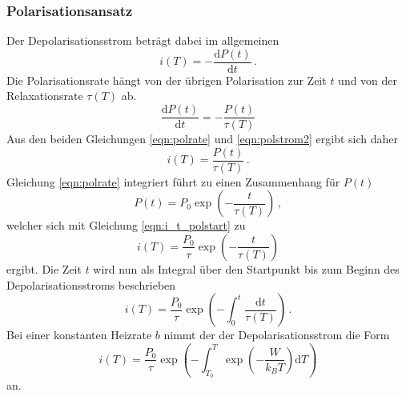 \subsubsection{Polarisationsansatz}
Der Depolarisationsstrom beträgt dabei im allgemeinen
\begin{equation}
    i(T) = -\frac{\mathrm{d}P(t)}{\mathrm{d}t}\,.
    \label{eqn:polstrom2}
\end{equation}
Die Polarisationsrate hängt von der übrigen Polarisation zur Zeit $t$
und von der Relaxationsrate $\tau(T)$ ab.
\begin{equation}
    \frac{\text{d}{P(t)}}{\text{d}{t}} = -\frac{P(t)}{\tau(T)}
    \label{eqn:polrate}
\end{equation}
Aus den beiden Gleichungen \eqref{eqn:polrate} und \eqref{eqn:polstrom2} ergibt sich daher
\begin{equation}
    i(T) = \frac{P(t)}{\tau(T)}\,.
    \label{eqn:i_t_polstart}
\end{equation}
Gleichung \eqref{eqn:polrate} integriert führt zu einen Zusammenhang für $P(t)$
\begin{equation}
    P(t) = P_{0} \exp\!\left(-\frac{t}{\tau(T)}\right)\,,
\end{equation}
welcher sich mit Gleichung \eqref{eqn:i_t_polstart} zu
\begin{equation}
    i(T) = \frac{P_0}{\tau} \exp\!\left(-\frac{t}{\tau(T)}\right) 
\end{equation}
ergibt.
Die Zeit $t$ wird nun als Integral über den Startpunkt bis zum Beginn des Depolarisationsstroms beschrieben
\begin{equation}
    i(T) = \frac{P_{0}}{\tau} \exp\!\left(-\int_0^t \frac{\text{d}{t}}{\tau(T)}\right)\,.
\end{equation}
Bei einer konstanten Heizrate $b$ nimmt der der Depolarisationsstrom die Form
\begin{equation}
    i(T) = \frac{P_0}{\tau} \exp\!\left(-\int_{T_0}^T
      \exp\!\left(- \frac{W}{k_B T}\right) \text{d}{T}\right)
    \label{eq:final}
\end{equation}
an.


